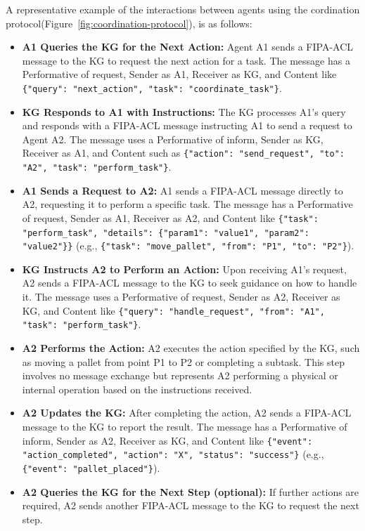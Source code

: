 \documentclass{article} %
\begin{document}
A representative example of the interactions between agents using the cordination protocol(Figure~\ref{fig:coordination-protocol}), is as follows: 
\begin{itemize}
\item \textbf{A1 Queries the KG for the Next Action:} Agent A1 sends a FIPA-ACL message to the KG to request the next action for a task. The message has a Performative of request, Sender as A1, Receiver as KG, and Content like \texttt{\{"query": "next\_action", "task": "coordinate\_task"\}}.

\item \textbf{KG Responds to A1 with Instructions:} The KG processes A1’s query and responds with a FIPA-ACL message instructing A1 to send a request to Agent A2. The message uses a Performative of inform, Sender as KG, Receiver as A1, and Content such as \texttt{\{"action": "send\_request", "to": "A2", "task": "perform\_task"\}}. 

\item \textbf{A1 Sends a Request to A2:} A1 sends a FIPA-ACL message directly to A2, requesting it to perform a specific task. The message has a Performative of request, Sender as A1, Receiver as A2, and Content like \texttt{\{"task": "perform\_task", "details": \{"param1": "value1", "param2": "value2"\}\}} (e.g., \texttt{\{"task": "move\_pallet", "from": "P1", "to": "P2"\}}).

\item \textbf{KG Instructs A2 to Perform an Action:} Upon receiving A1’s request, A2 sends a FIPA-ACL message to the KG to seek guidance on how to handle it. The message uses a Performative of request, Sender as A2, Receiver as KG, and Content like \texttt{\{"query": "handle\_request", "from": "A1", "task": "perform\_task"\}}.

\item \textbf{A2 Performs the Action:} A2 executes the action specified by the KG, such as moving a pallet from point P1 to P2 or completing a subtask. This step involves no message exchange but represents A2 performing a physical or internal operation based on the instructions received.

\item \textbf{A2 Updates the KG:} After completing the action, A2 sends a FIPA-ACL message to the KG to report the result. The message has a Performative of inform, Sender as A2, Receiver as KG, and Content like \texttt{\{"event": "action\_completed", "action": "X", "status": "success"\}} (e.g., \texttt{\{"event": "pallet\_placed"\}}).

\item \textbf{A2 Queries the KG for the Next Step (optional):} If further actions are required, A2 sends another FIPA-ACL message to the KG to request the next step.
\end{itemize}
\end{document}
